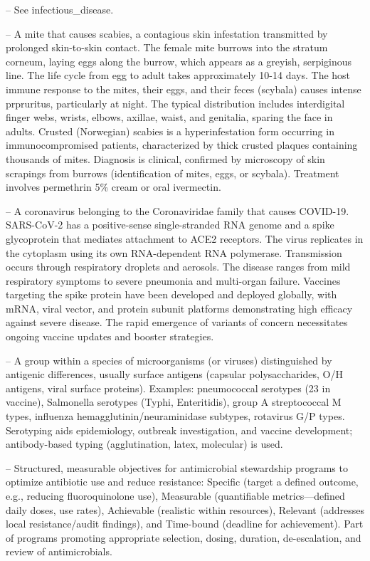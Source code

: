 -- See infectious\_disease.

-- A mite that causes scabies, a contagious skin infestation transmitted by prolonged skin-to-skin contact. The female mite burrows into the stratum corneum, laying eggs along the burrow, which appears as a greyish, serpiginous line. The life cycle from egg to adult takes approximately 10-14 days. The host immune response to the mites, their eggs, and their feces (scybala) causes intense prpruritus, particularly at night. The typical distribution includes interdigital finger webs, wrists, elbows, axillae, waist, and genitalia, sparing the face in adults. Crusted (Norwegian) scabies is a hyperinfestation form occurring in immunocompromised patients, characterized by thick crusted plaques containing thousands of mites. Diagnosis is clinical, confirmed by microscopy of skin scrapings from burrows (identification of mites, eggs, or scybala). Treatment involves permethrin 5\% cream or oral ivermectin.

-- A coronavirus belonging to the Coronaviridae family that causes COVID-19. SARS-CoV-2 has a positive-sense single-stranded RNA genome and a spike glycoprotein that mediates attachment to ACE2 receptors. The virus replicates in the cytoplasm using its own RNA-dependent RNA polymerase. Transmission occurs through respiratory droplets and aerosols. The disease ranges from mild respiratory symptoms to severe pneumonia and multi-organ failure. Vaccines targeting the spike protein have been developed and deployed globally, with mRNA, viral vector, and protein subunit platforms demonstrating high efficacy against severe disease. The rapid emergence of variants of concern necessitates ongoing vaccine updates and booster strategies.

-- A group within a species of microorganisms (or viruses) distinguished by antigenic differences, usually surface antigens (capsular polysaccharides, O/H antigens, viral surface proteins). Examples: pneumococcal serotypes (23 in vaccine), Salmonella serotypes (Typhi, Enteritidis), group A streptococcal M types, influenza hemagglutinin/neuraminidase subtypes, rotavirus G/P types. Serotyping aids epidemiology, outbreak investigation, and vaccine development; antibody-based typing (agglutination, latex, molecular) is used.

-- Structured, measurable objectives for antimicrobial stewardship programs to optimize antibiotic use and reduce resistance: Specific (target a defined outcome, e.g., reducing fluoroquinolone use), Measurable (quantifiable metrics—defined daily doses, use rates), Achievable (realistic within resources), Relevant (addresses local resistance/audit findings), and Time-bound (deadline for achievement). Part of programs promoting appropriate selection, dosing, duration, de-escalation, and review of antimicrobials.


